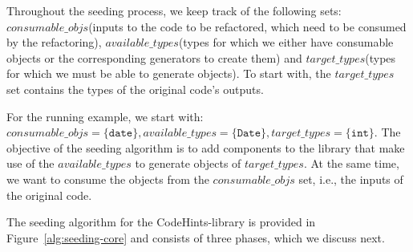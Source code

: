 \documentclass[sigconf]{acmart}
\newcommand{\consumableobjs}{\mbox{$\mathit{consumable\_objs}$}\xspace}
\newcommand{\availabletypes}{\mbox{$\mathit{available\_types}$}\xspace}
\newcommand{\targettypes}{\mbox{$\mathit{target\_types}$}\xspace}
\begin{document}


Throughout the seeding process, we keep track of the following sets:
\consumableobjs (inputs to the code to be refactored, which need to be consumed by the refactoring),
\availabletypes (types for which we either have consumable objects or the corresponding generators to create them) and
\targettypes (types for which we must be able to generate objects). To start with, the \targettypes set
contains the types of the original code's outputs. %

For the running example, we start with:
  $\consumableobjs = \{\texttt{date}\},
  \availabletypes = \{\texttt{Date}\},
  \targettypes    = \{\texttt{int}\}$.
%
%
%
The objective of the seeding algorithm is to
add components to the library that make use of the \availabletypes to generate objects
of \targettypes. At the same time, we want to consume the objects from the
\consumableobjs set, i.e., the inputs of the original code.

The seeding algorithm for the CodeHints-library is provided in Figure~\ref{alg:seeding-core} and consists of three phases, which we discuss next.
\end{document}
